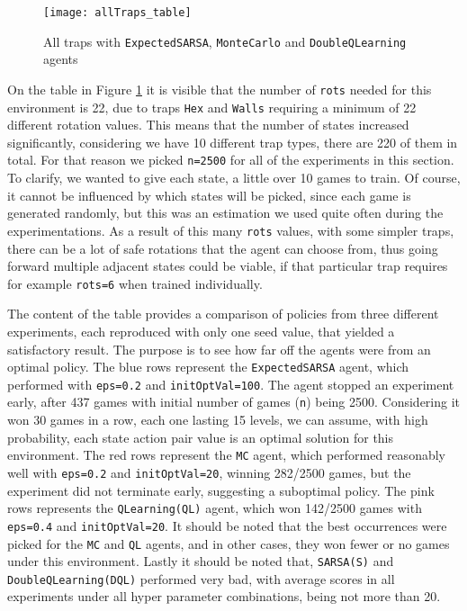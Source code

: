 \begin{figure}[h]
    \centering
    \texttt{[image: allTraps\_table]}
    \caption{All traps with \texttt{ExpectedSARSA}, \texttt{MonteCarlo} and \texttt{DoubleQLearning} agents}
    \label{fig:traps_table_eg}
\end{figure}

On the table in Figure \ref{fig:traps_table_eg} it is visible that the number of \texttt{rots} needed for this environment is 22, due to traps \texttt{Hex} and \texttt{Walls} requiring a minimum of 22 different rotation values. This means that the number of states increased significantly, considering we have 10 different trap types, there are 220 of them in total. For that reason we picked \texttt{n=2500} for all of the experiments in this section. To clarify, we wanted to give each state, a little over 10 games to train. Of course, it cannot be influenced by which states will be picked, since each game is generated randomly, but this was an estimation we used quite often during the experimentations. As a result of this many \texttt{rots} values, with some simpler traps, there can be a lot of safe  rotations that the agent can choose from, thus going forward multiple adjacent states could be viable, if that particular trap requires for example \texttt{rots=6} when trained individually.

The content of the table provides a comparison of policies from three different experiments, each reproduced with only one seed value, that yielded a satisfactory result. The purpose is to see how far off the agents were from an optimal policy. The blue rows represent the \texttt{ExpectedSARSA} agent, which performed with \texttt{eps=0.2} and \texttt{initOptVal=100}. The agent stopped an experiment early, after 437 games with initial number of games (\texttt{n}) being 2500. Considering it won 30 games in a row, each one lasting 15 levels, we can assume, with high probability, each state action pair value is an optimal solution for this environment. The red rows represent the \texttt{MC} agent, which performed reasonably well with \texttt{eps=0.2} and \texttt{initOptVal=20}, winning 282/2500 games, but the experiment did not terminate early, suggesting a suboptimal policy. The pink rows represents the \texttt{QLearning(QL)} agent, which won 142/2500 games with \texttt{eps=0.4} and \texttt{initOptVal=20}. It should be noted that the best occurrences were picked for the \texttt{MC} and \texttt{QL} agents, and in other cases, they won fewer or no games under this environment. Lastly it should be noted that, \texttt{SARSA(S)} and \texttt{DoubleQLearning(DQL)}  performed very bad, with average scores in all experiments under all hyper parameter combinations, being not more than 20.

